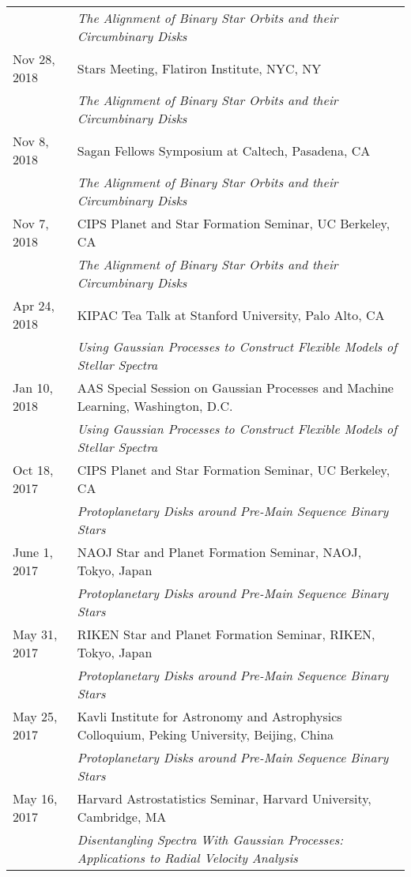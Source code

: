 \begin{longtable}{@{\hspace{10pt}}p{1.2in}l}
  & \emph{The Alignment of Binary Star Orbits and their Circumbinary Disks} \\[\rowskip]
  Nov 28, 2018 & Stars Meeting, Flatiron Institute, NYC, NY \\
  & \emph{The Alignment of Binary Star Orbits and their Circumbinary Disks} \\[\rowskip]
  Nov 8, 2018 & Sagan Fellows Symposium at Caltech, Pasadena, CA \\
  & \emph{The Alignment of Binary Star Orbits and their Circumbinary Disks} \\[\rowskip]
  Nov 7, 2018 & CIPS Planet and Star Formation Seminar, UC Berkeley, CA  \\
  & \emph{The Alignment of Binary Star Orbits and their Circumbinary Disks} \\[\rowskip]
  Apr 24, 2018 & KIPAC Tea Talk at Stanford University, Palo Alto, CA \\
  & \emph{Using Gaussian Processes to Construct Flexible Models of Stellar Spectra} \\[\rowskip]
  Jan 10, 2018 & AAS Special Session on Gaussian Processes and Machine Learning, Washington, D.C. \\
  & \emph{Using Gaussian Processes to Construct Flexible Models of Stellar Spectra}\\[\rowskip]
  Oct 18, 2017 & CIPS Planet and Star Formation Seminar, UC Berkeley, CA \\
  & \emph{Protoplanetary Disks around Pre-Main Sequence Binary Stars} \\[\rowskip]
  June 1, 2017 & NAOJ Star and Planet Formation Seminar, NAOJ, Tokyo, Japan \\
  & \emph{Protoplanetary Disks around Pre-Main Sequence Binary Stars} \\[\rowskip]
  May 31, 2017 & RIKEN Star and Planet Formation Seminar, RIKEN, Tokyo, Japan \\
  & \emph{Protoplanetary Disks around Pre-Main Sequence Binary Stars} \\[\rowskip]
  May 25, 2017 & Kavli Institute for Astronomy and Astrophysics Colloquium, Peking University, Beijing, China \\
  & \emph{Protoplanetary Disks around Pre-Main Sequence Binary Stars} \\[\rowskip]
  May 16, 2017 & Harvard Astrostatistics Seminar, Harvard University, Cambridge, MA \\
  & \emph{Disentangling Spectra With Gaussian Processes: Applications to Radial Velocity Analysis} \\[\rowskip]

\end{longtable}
